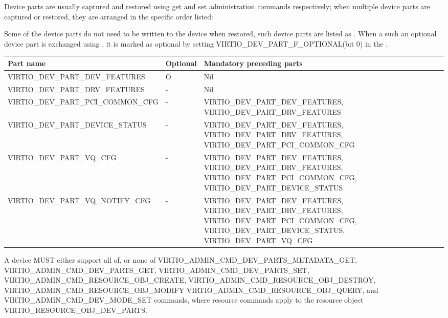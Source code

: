 Device parts are usually captured and restored using get and set administration
commands respectively; when multiple device parts are captured or restored,
they are arranged in the specific order listed:

Some of the device parts do not need to be written to the device when restored, such
device parts are listed as . When a such an optional device part is
exchanged using , it is marked as optional by
setting VIRTIO_DEV_PART_F_OPTIONAL(bit 0) in the .

\begin{table}[H]
\caption{Device parts order}
\label{table:Basic Facilities of a Virtio Device / Device groups / Group administration commands / Device parts / Device parts order/ Device parts order}
\begin{xltabular}{\textwidth}{ |l|l|X| }
\hline
Part name & Optional & Mandatory preceding parts \\
\hline \hline
\hline
VIRTIO_DEV_PART_DEV_FEATURES & O & Nil \\
\hline
VIRTIO_DEV_PART_DRV_FEATURES & - & Nil \\
\hline
VIRTIO_DEV_PART_PCI_COMMON_CFG & - & VIRTIO_DEV_PART_DEV_FEATURES, VIRTIO_DEV_PART_DRV_FEATURES \\
\hline
VIRTIO_DEV_PART_DEVICE_STATUS & - & VIRTIO_DEV_PART_DEV_FEATURES, VIRTIO_DEV_PART_DRV_FEATURES, VIRTIO_DEV_PART_PCI_COMMON_CFG \\
\hline
VIRTIO_DEV_PART_VQ_CFG & - & VIRTIO_DEV_PART_DEV_FEATURES, VIRTIO_DEV_PART_DRV_FEATURES, VIRTIO_DEV_PART_PCI_COMMON_CFG,
                             VIRTIO_DEV_PART_DEVICE_STATUS \\
\hline
VIRTIO_DEV_PART_VQ_NOTIFY_CFG & - & VIRTIO_DEV_PART_DEV_FEATURES, VIRTIO_DEV_PART_DRV_FEATURES, VIRTIO_DEV_PART_PCI_COMMON_CFG,
                             VIRTIO_DEV_PART_DEVICE_STATUS, VIRTIO_DEV_PART_VQ_CFG \\
\hline
\hline
\end{xltabular}
\end{table}


A device MUST either support all of, or none of
VIRTIO_ADMIN_CMD_DEV_PARTS_METADATA_GET,
VIRTIO_ADMIN_CMD_DEV_PARTS_GET, VIRTIO_ADMIN_CMD_DEV_PARTS_SET,
VIRTIO_ADMIN_CMD_RESOURCE_OBJ_CREATE,
VIRTIO_ADMIN_CMD_RESOURCE_OBJ_DESTROY, VIRTIO_ADMIN_CMD_RESOURCE_OBJ_MODIFY
VIRTIO_ADMIN_CMD_RESOURCE_OBJ_QUERY, and
VIRTIO_ADMIN_CMD_DEV_MODE_SET commands, where resource commands apply to
the resource object VIRTIO_RESOURCE_OBJ_DEV_PARTS.

